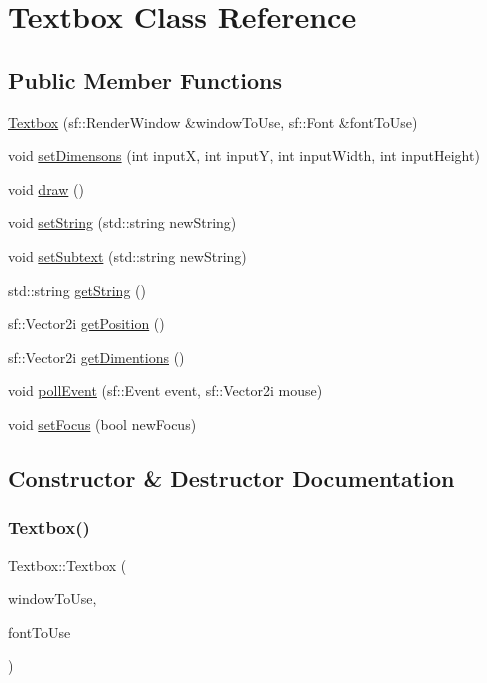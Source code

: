\hypertarget{classTextbox}{}\section{Textbox Class Reference}
\label{classTextbox}
\subsection*{Public Member Functions}
\begin{DoxyCompactItemize}
\item 
\hyperlink{classTextbox_a334bbce5eb5bd7c4527d0a4f8350ec5e}{Textbox} (sf\+::\+Render\+Window \&window\+To\+Use, sf\+::\+Font \&font\+To\+Use)
\item 
void \hyperlink{classTextbox_ab2f7b56bd15ece4a004a7eb3bf5eee70}{set\+Dimensons} (int inputX, int inputY, int input\+Width, int input\+Height)
\item 
void \hyperlink{classTextbox_a164e6dfbd1964b36b05de0cf84d07abf}{draw} ()
\item 
void \hyperlink{classTextbox_a2a455fbd16c3070c2711fca4fd36c69b}{set\+String} (std\+::string new\+String)
\item 
void \hyperlink{classTextbox_a335daf1a9ee0ba2e8c386b9127a723de}{set\+Subtext} (std\+::string new\+String)
\item 
std\+::string \hyperlink{classTextbox_a17e61a2d99b5ca00c54a6df45a6018ea}{get\+String} ()
\item 
sf\+::\+Vector2i \hyperlink{classTextbox_a985949299db5b449611386bb260c0ec0}{get\+Position} ()
\item 
sf\+::\+Vector2i \hyperlink{classTextbox_a44e7f5e3425245979a682e37748e3463}{get\+Dimentions} ()
\item 
void \hyperlink{classTextbox_a0fa6796fb75711d78a180031d510a9ed}{poll\+Event} (sf\+::\+Event event, sf\+::\+Vector2i mouse)
\item 
void \hyperlink{classTextbox_abcc939b4d641fb157ec5ea59512a773c}{set\+Focus} (bool new\+Focus)
\end{DoxyCompactItemize}


\subsection{Constructor \& Destructor Documentation}
\mbox{\label{classTextbox_a334bbce5eb5bd7c4527d0a4f8350ec5e}} 
\subsubsection{\texorpdfstring{Textbox()}{Textbox()}}
{\footnotesize\ttfamily Textbox\+::\+Textbox (\begin{DoxyParamCaption}\item[{sf\+::\+Render\+Window \&}]{window\+To\+Use,  }\item[{sf\+::\+Font \&}]{font\+To\+Use }\end{DoxyParamCaption})}

